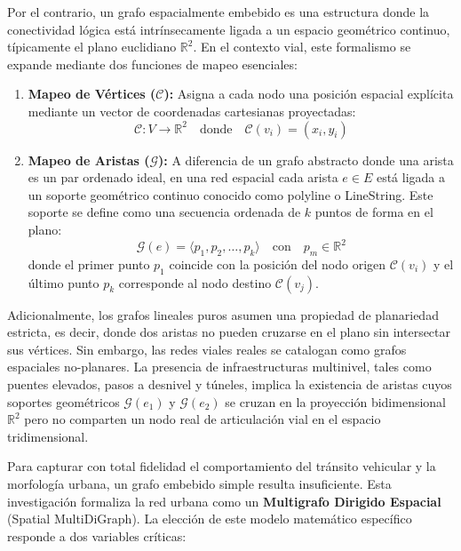 Por el contrario, un grafo espacialmente embebido es una estructura donde la conectividad lógica está intrínsecamente ligada a un espacio geométrico continuo, típicamente el plano euclidiano $\mathbb{R}^2$. En el contexto vial, este formalismo se expande mediante dos funciones de mapeo esenciales:

\begin{enumerate}
    \item \textbf{Mapeo de Vértices ($\mathcal{C}$):} Asigna a cada nodo una posición espacial explícita mediante un vector de coordenadas cartesianas proyectadas:
    \begin{equation}
    \mathcal{C}: V \rightarrow \mathbb{R}^2 \quad \text{donde} \quad \mathcal{C}(v_i) = (x_i, y_i)
    \end{equation}
    
    \item \textbf{Mapeo de Aristas ($\mathcal{G}$):} A diferencia de un grafo abstracto donde una arista es un par ordenado ideal, en una red espacial cada arista $e \in E$ está ligada a un soporte geométrico continuo conocido como polyline o LineString. Este soporte se define como una secuencia ordenada de $k$ puntos de forma en el plano:
    \begin{equation}
    \mathcal{G}(e) = \langle p_1, p_2, \dots, p_k \rangle \quad \text{con} \quad p_m \in \mathbb{R}^2
    \end{equation}
    donde el primer punto $p_1$ coincide con la posición del nodo origen $\mathcal{C}(v_i)$ y el último punto $p_k$ corresponde al nodo destino $\mathcal{C}(v_j)$.
\end{enumerate}

Adicionalmente, los grafos lineales puros asumen una propiedad de planariedad estricta, es decir, donde dos aristas no pueden cruzarse en el plano sin intersectar sus vértices. Sin embargo, las redes viales reales se catalogan como grafos espaciales no-planares. La presencia de infraestructuras multinivel, tales como puentes elevados, pasos a desnivel y túneles, implica la existencia de aristas cuyos soportes geométricos $\mathcal{G}(e_1)$ y $\mathcal{G}(e_2)$ se cruzan en la proyección bidimensional $\mathbb{R}^2$ pero no comparten un nodo real de articulación vial en el espacio tridimensional.

Para capturar con total fidelidad el comportamiento del tránsito vehicular y la morfología urbana, un grafo embebido simple resulta insuficiente. Esta investigación formaliza la red urbana como un \textbf{Multigrafo Dirigido Espacial} (Spatial MultiDiGraph). La elección de este modelo matemático específico responde a dos variables críticas:

